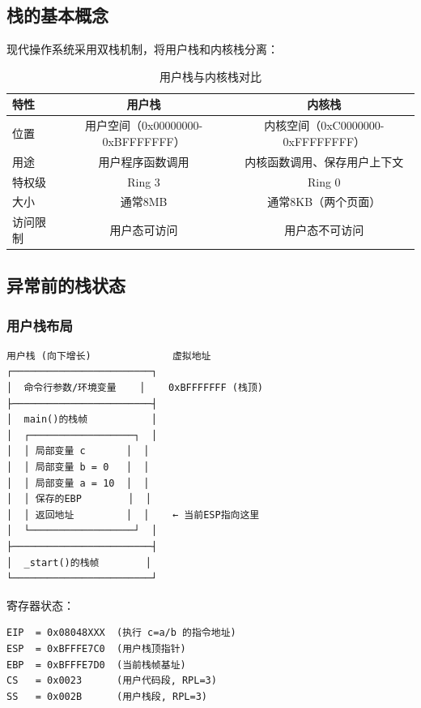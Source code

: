 \documentclass[UTF8,a4paper,12pt]{ctexart}
\begin{document}
\subsection{栈的基本概念}

现代操作系统采用双栈机制，将用户栈和内核栈分离：

\begin{table}[H]
\centering
\caption{用户栈与内核栈对比}
\begin{tabular}{lcc}
\toprule
\textbf{特性} & \textbf{用户栈} & \textbf{内核栈} \\
\midrule
位置 & 用户空间（0x00000000-0xBFFFFFFF） & 内核空间（0xC0000000-0xFFFFFFFF） \\
用途 & 用户程序函数调用 & 内核函数调用、保存用户上下文 \\
特权级 & Ring 3 & Ring 0 \\
大小 & 通常8MB & 通常8KB（两个页面） \\
访问限制 & 用户态可访问 & 用户态不可访问 \\
\bottomrule
\end{tabular}
\end{table}

\subsection{异常前的栈状态}

\subsubsection{用户栈布局}

\begin{lstlisting}[style=cstyle,caption={用户栈示意图}]
用户栈 (向下增长)              虚拟地址
┌────────────────────────┐
│  命令行参数/环境变量    │    0xBFFFFFFF (栈顶)
├────────────────────────┤
│  main()的栈帧           │
│  ┌──────────────────┐  │
│  │ 局部变量 c       │  │
│  │ 局部变量 b = 0   │  │
│  │ 局部变量 a = 10  │  │
│  │ 保存的EBP        │  │
│  │ 返回地址         │  │    ← 当前ESP指向这里
│  └──────────────────┘  │
├────────────────────────┤
│  _start()的栈帧        │
└────────────────────────┘
\end{lstlisting}

寄存器状态：
\begin{lstlisting}[style=bashstyle]
EIP  = 0x08048XXX  (执行 c=a/b 的指令地址)
ESP  = 0xBFFFE7C0  (用户栈顶指针)
EBP  = 0xBFFFE7D0  (当前栈帧基址)
CS   = 0x0023      (用户代码段, RPL=3)
SS   = 0x002B      (用户栈段, RPL=3)
\end{lstlisting}
\end{document}
